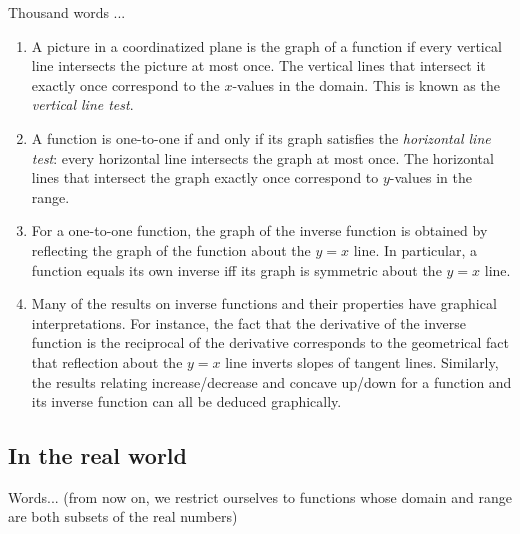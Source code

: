 \documentclass[10pt]{amsart}
\begin{document}
Thousand words ...

\begin{enumerate}
\item A picture in a coordinatized plane is the graph of a function if
  every vertical line intersects the picture at most once. The
  vertical lines that intersect it exactly once correspond to the
  $x$-values in the domain. This is known as the {\em vertical line
  test}.
\item A function is one-to-one if and only if its graph satisfies the
  {\em horizontal line test}: every horizontal line intersects the
  graph at most once. The horizontal lines that intersect the graph
  exactly once correspond to $y$-values in the range.
\item For a one-to-one function, the graph of the inverse function is
  obtained by reflecting the graph of the function about the $y = x$
  line. In particular, a function equals its own inverse iff its graph
  is symmetric about the $y = x$ line.
\item Many of the results on inverse functions and their properties
  have graphical interpretations. For instance, the fact that the
  derivative of the inverse function is the reciprocal of the
  derivative corresponds to the geometrical fact that reflection about
  the $y = x$ line inverts slopes of tangent lines. Similarly, the
  results relating increase/decrease and concave up/down for a
  function and its inverse function can all be deduced graphically.
\end{enumerate}

\subsection{In the real world}

Words... (from now on, we restrict ourselves to functions whose domain
and range are both subsets of the real numbers)
\end{document}
